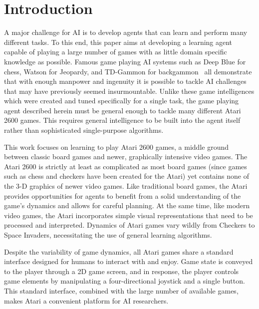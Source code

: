 \documentclass{sig-alternate}
\begin{document}


\section{Introduction}
A major challenge for AI is to develop agents that can learn and perform many different tasks. To this end, this paper aims at developing a learning agent capable of playing a large number of games with as little domain specific knowledge as possible. Famous game playing AI systems such as Deep Blue for chess, Watson for Jeopardy, and TD-Gammon for backgammon~\cite{tesauro_94} all demonstrate that with enough manpower and ingenuity it is possible to tackle AI challenges that may have previously seemed insurmountable. Unlike these game intelligences which were created and tuned specifically for a single task, the game playing agent described herein must be general enough to tackle many different Atari 2600 games. This requires general intelligence to be built into the agent itself rather than sophisticated single-purpose algorithms.

This work focuses on learning to play Atari 2600 games, a middle ground between classic board games and newer, graphically intensive video games. The Atari 2600 is strictly at least as complicated as most board games (since games such as chess and checkers have been created for the Atari) yet contains none of the 3-D graphics of newer video games. Like traditional board games, the Atari provides opportunities for agents to benefit from a solid understanding of the game's dynamics and allows for careful planning. At the same time, like modern video games, the Atari incorporates simple visual representations that need to be processed and interpreted. Dynamics of Atari games vary wildly from Checkers to Space Invaders, necessitating the use of general learning algorithms.

Despite the variability of game dynamics, all Atari games share a standard interface designed for humans to interact with and enjoy. Game state is conveyed to the player through a 2D game screen, and in response, the player controls game elements by manipulating a four-directional joystick and a single button. This standard interface, combined with the large number of available games, makes Atari a convenient platform for AI researchers. 
\end{document}
